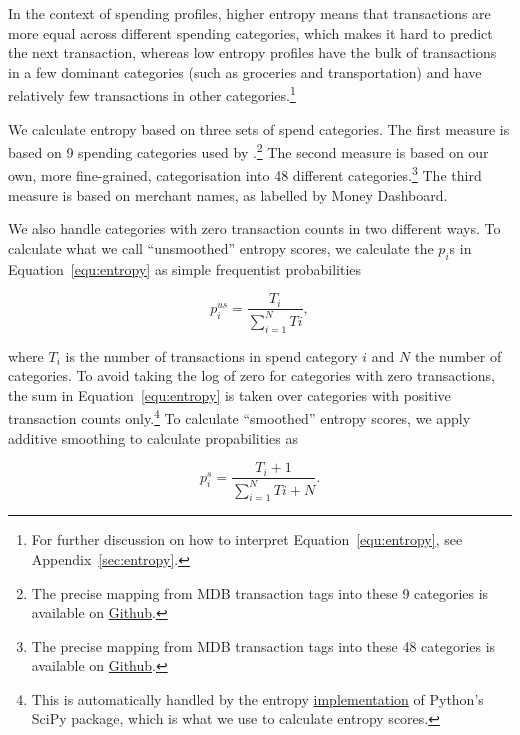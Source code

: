In the context of spending profiles, higher entropy means that transactions are
more equal across different spending categories, which makes it hard to predict
the next transaction, whereas low entropy profiles have the bulk of
transactions in a few dominant categories (such as groceries and
transportation) and have relatively few transactions in other
categories.\footnote{For further discussion on how to interpret
Equation~\ref{equ:entropy}, see Appendix~\ref{sec:entropy}.}

We calculate entropy based on three sets of spend categories. The first measure
is based on 9 spending categories used by
\citet{muggleton2020evidence}.\footnote{The precise mapping from MDB
    transaction tags into these 9 categories is available on
\href{https://github.com/fabiangunzinger/entropy/blob/7fa9c565bf8959ea92a9d4fe2245da0864e19c27/src/data/txn_classifications.py\#L249}{Github}.}
The second measure is based on our own, more fine-grained, categorisation into
48 different categories.\footnote{The precise mapping from MDB transaction tags
into these 48 categories is available on
\href{https://github.com/fabiangunzinger/entropy/blob/7fa9c565bf8959ea92a9d4fe2245da0864e19c27/src/data/txn_classifications.py\#L503}{Github}.}
The third measure is based on merchant names, as labelled by Money Dashboard.

We also handle categories with zero transaction counts in two different ways.
To calculate what we call ``unsmoothed'' entropy scores, we calculate the
$p_i$s in Equation~\ref{equ:entropy} as simple frequentist probabilities

\begin{equation}
    p_i^{us} = \frac{T_i}{\sum_{i=1}^{N}Ti},
\end{equation}

\noindent where $T_i$ is the number of transactions in spend category $i$ and
$N$ the number of categories. To avoid taking the log of zero for categories
with zero transactions, the sum in Equation~\ref{equ:entropy} is taken over
categories with positive transaction counts only.\footnote{This is
automatically handled by the entropy
\href{https://docs.scipy.org/doc/scipy/reference/generated/scipy.stats.entropy.html}{implementation}
of Python's SciPy package, which is what we use to calculate entropy scores.}
To calculate ``smoothed'' entropy scores, we apply additive smoothing to
calculate propabilities as

\begin{equation}
    p_i^{s} = \frac{T_i + 1}{\sum_{i=1}^{N}Ti + N}.
\end{equation}

